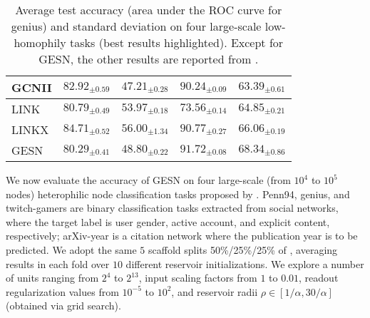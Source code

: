 \documentclass[final,5p,times,twocolumn]{elsarticle}
\begin{document}
\begin{table*}
\begin{tabular}{lcccc}
		GCNII & $82.92_{\pm 0.59}$ & $47.21_{\pm 0.28}$ & $90.24_{\pm 0.09}$ & $63.39_{\pm 0.61}$ \\
		\midrule
		LINK & $80.79_{\pm 0.49}$ & $53.97_{\pm 0.18}$ & $73.56_{\pm 0.14}$ & $64.85_{\pm 0.21}$ \\
		LINKX & $\mathbf{84.71}_{\pm 0.52}$ & $\mathbf{56.00}_{\pm 1.34}$ & $90.77_{\pm 0.27}$ & $66.06_{\pm 0.19}$ \\
		\midrule
		GESN & $80.29_{\pm 0.41}$ & $48.80_{\pm 0.22}$ & $\mathbf{91.72}_{\pm 0.08}$ & $\mathbf{68.34}_{\pm 0.86}$ \\
		\bottomrule
	\end{tabular}
\caption{Average test accuracy (area under the ROC curve for genius) and standard deviation on four large-scale low-homophily tasks (best results highlighted). Except for GESN, the other results are reported from \cite{Lim2021}.}
\label{tab:experiments-large}
\end{table*}

We now evaluate the accuracy of GESN on four large-scale (from $10^4$ to $10^5$ nodes) heterophilic node classification tasks proposed by \cite{Lim2021}.
Penn94, genius, and twitch-gamers are binary classification tasks extracted from social networks, where the target label is user gender, active account, and explicit content, respectively; arXiv-year is a citation network where the publication year is to be predicted.
We adopt the same $5$ scaffold splits 50\%/25\%/25\% of \cite{Lim2021}, averaging results in each fold over $10$ different reservoir initializations.
We explore a number of units ranging from $2^4$ to $2^{13}$, input scaling factors from $1$ to $0.01$, readout regularization values from $10^{-5}$ to $10^2$, and reservoir radii $\rho \in [1/\alpha, 30/\alpha]$ (obtained via grid search).
\end{document}
